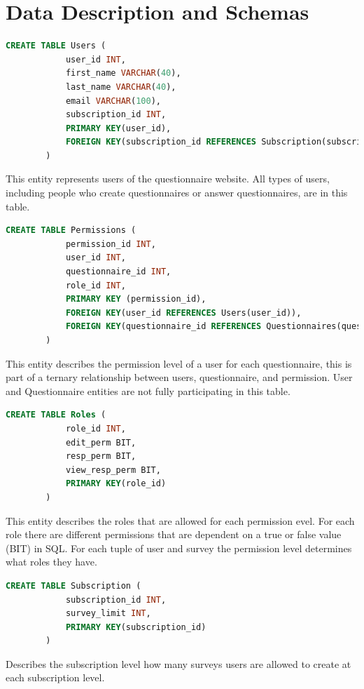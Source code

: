 \documentclass[12pt, oneside, a4paper]{article}
\begin{document}
    \newpage
    \section{Data Description and Schemas}
    \begin{lstlisting}[language=SQL, columns=flexible]
        CREATE TABLE Users (
            user_id INT,
            first_name VARCHAR(40),
            last_name VARCHAR(40),
            email VARCHAR(100),
            subscription_id INT, 
            PRIMARY KEY(user_id),
            FOREIGN KEY(subscription_id REFERENCES Subscription(subscription_id))
        ) 
    \end{lstlisting}
    This entity represents users of the questionnaire website.
    All types of users, including people who create questionnaires
    or answer questionnaires, are in this table.
    \\

    \begin{lstlisting}[language=SQL, columns=flexible]
        CREATE TABLE Permissions (
            permission_id INT,
            user_id INT,
            questionnaire_id INT,
            role_id INT,
            PRIMARY KEY (permission_id),
            FOREIGN KEY(user_id REFERENCES Users(user_id)),
            FOREIGN KEY(questionnaire_id REFERENCES Questionnaires(questionnaire_id))
        ) 
    \end{lstlisting}
    This entity describes the permission level of a user for each 
    questionnaire, this is part of a ternary relationship between users, questionnaire, and permission. User and Questionnaire entities are not fully participating in this table. 
    \\
    
    \begin{lstlisting}[language=SQL, columns=flexible]
        CREATE TABLE Roles (
            role_id INT,
            edit_perm BIT, 
            resp_perm BIT,
            view_resp_perm BIT,
            PRIMARY KEY(role_id)
        ) 
    \end{lstlisting}
    This entity describes the roles that are allowed for each permission evel. For each role there are different permissions that are dependent on a true or false value (BIT) in SQL. For each tuple of user and survey the permission level determines what roles they have.
    \\

    \begin{lstlisting}[language=SQL, columns=flexible]
        CREATE TABLE Subscription (
            subscription_id INT,
            survey_limit INT, 
            PRIMARY KEY(subscription_id)
        ) 
    \end{lstlisting}
    Describes the subscription level how many surveys users are allowed to create at each subscription level. 
    \\
\end{document}
